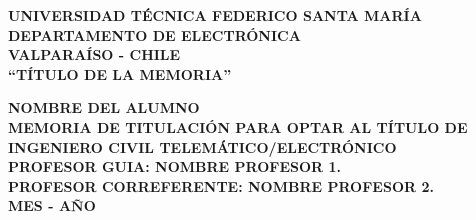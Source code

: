 \documentclass[letterpaper,12pt,twoside]{thesis}
\begin{document}
\begin{center}
\linespread{1.15}
\textbf{\large{UNIVERSIDAD TÉCNICA FEDERICO SANTA MARÍA\\}
\normalsize{DEPARTAMENTO DE ELECTRÓNICA\\VALPARAÍSO - CHILE\\}}
\vspace{0.5cm}
\vskip 6cm
\LARGE{\bf ``TÍTULO DE LA MEMORIA''}
\vskip 1.5cm
\end{center}

\begin{center}
\hangindent=0cm\large \textbf{NOMBRE DEL ALUMNO}\\
\vspace{0.5cm}
\hangindent=0cm\normalsize \textbf{MEMORIA DE TITULACIÓN PARA OPTAR AL TÍTULO DE INGENIERO CIVIL TELEMÁTICO/ELECTRÓNICO}\\
\vspace{1cm}
\hangindent=0cm\normalsize \textbf{PROFESOR GUIA: \hspace{2cm} NOMBRE PROFESOR 1.}\\
\vspace{0.5cm}
\hangindent=0cm\normalsize \textbf{PROFESOR CORREFERENTE: \hspace{2cm} NOMBRE PROFESOR 2.}\\
\vskip 1cm
\textbf{MES - AÑO}
\end{center}
\thispagestyle{empty}

\newpage
\thispagestyle{empty}
\cleardoublepage
\pagestyle{fancy}
\renewcommand\headrulewidth{0pt}


\pagestyle{fancy}
\setcounter{page}{1}
\newpage
\thispagestyle{empty}
\renewcommand{\contentsname}{\'Indice general}
\tableofcontents

\newpage
\thispagestyle{empty}
\renewcommand{\listfigurename}{\'Indice de figuras}
\listoffigures

\newpage
\thispagestyle{empty}
\renewcommand{\listtablename}{\'Indice de tablas}
\listoftables
\thispagestyle{empty}

\newpage
\thispagestyle{empty}
\renewcommand\headrulewidth{0.4pt}


\newpage
\pagestyle{fancy}
\renewcommand\headrulewidth{0.4pt}


\newpage
\thispagestyle{empty}
\renewcommand\headrulewidth{0.4pt}


\newpage
\pagestyle{fancy}
\renewcommand\headrulewidth{0.4pt}


\newpage
\pagestyle{fancy}
\renewcommand\headrulewidth{0.4pt}


\newpage
\thispagestyle{empty}
\pagestyle{fancy}
\renewcommand\headrulewidth{0.4pt}


\newpage
\thispagestyle{empty}
\pagestyle{fancy}
\renewcommand\headrulewidth{0.4pt}

\end{document}
